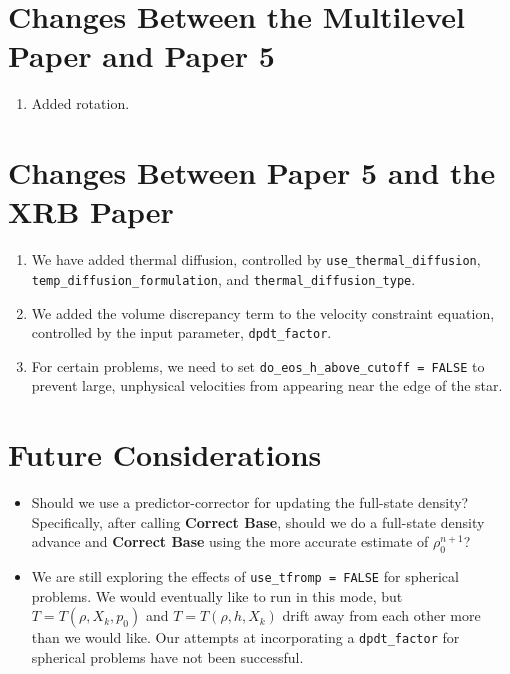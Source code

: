 \section{Changes Between the Multilevel Paper and Paper 5}
\begin{enumerate}
\item Added rotation.
\end{enumerate}
\section{Changes Between Paper 5 and the XRB Paper}
\begin{enumerate}
\item We have added thermal diffusion, controlled by {\tt use\_thermal\_diffusion},
{\tt temp\_diffusion\_formulation}, and {\tt thermal\_diffusion\_type}.
\item We added the volume discrepancy term to the velocity constraint equation,
controlled by the input parameter, {\tt dpdt\_factor}.
\item For certain problems, we need to set {\tt do\_eos\_h\_above\_cutoff = FALSE}
to prevent large, unphysical velocities from appearing near the edge of the star.
\end{enumerate}


\section{Future Considerations}

\begin{itemize}
\item Should we use a predictor-corrector for updating the full-state density?
Specifically, after calling {\bf Correct Base}, should we do a full-state density 
advance and {\bf Correct Base} using the more accurate estimate of $\rho_0^{n+1}$?
\item We are still exploring the effects of {\tt use\_tfromp = FALSE} for spherical
problems.  We would eventually like to run in this mode, but $T=T(\rho,X_k,p_0)$ 
and $T=T(\rho,h,X_k)$ drift away from each other more than we would like.  Our
attempts at incorporating a {\tt dpdt\_factor} for spherical problems have not 
been successful.
\end{itemize}


